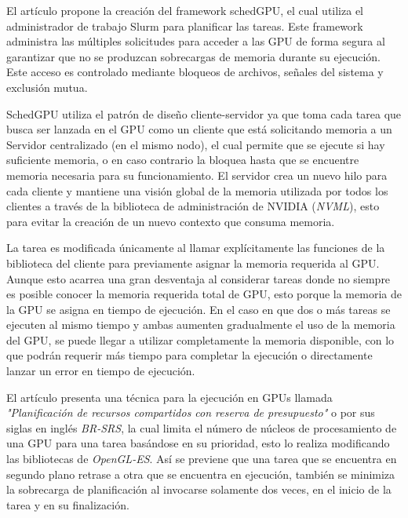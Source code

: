 
El artículo \cite{IntraNode} propone la creación del framework schedGPU, el cual utiliza el administrador de trabajo Slurm para planificar las tareas. Este framework administra las múltiples solicitudes para acceder a las GPU de forma segura al garantizar que no se produzcan sobrecargas de memoria durante su ejecución. Este acceso es controlado mediante bloqueos de archivos, señales del sistema y exclusión mutua.

SchedGPU utiliza el patrón de diseño cliente-servidor ya que toma cada tarea que busca ser lanzada en el GPU como un cliente que está solicitando memoria a un Servidor centralizado (en el mismo nodo), el cual permite que se ejecute si hay suficiente memoria, o en caso contrario la bloquea hasta que se encuentre memoria necesaria para su funcionamiento. El servidor crea un nuevo hilo para cada cliente y mantiene una visión global de la memoria utilizada por todos los clientes a través de la biblioteca de administración de NVIDIA (\textit{NVML}), esto para evitar la creación de un nuevo contexto que consuma memoria.

\vspace{0.3cm}

La tarea es modificada únicamente al llamar explícitamente las funciones de la biblioteca del cliente para previamente asignar la memoria requerida al GPU. Aunque esto acarrea una gran desventaja al considerar tareas donde no siempre es posible conocer la memoria requerida total de GPU, esto porque la memoria de la GPU se asigna en tiempo de ejecución. En el caso en que dos o más tareas se ejecuten al mismo tiempo y ambas aumenten gradualmente el uso de la memoria del GPU, se puede llegar a utilizar completamente la memoria disponible, con lo que podrán requerir más tiempo para completar la ejecución o directamente lanzar un error en tiempo de ejecución.
	
	
	El artículo \cite{Pridriven} presenta una técnica para la ejecución en GPUs llamada \textit{"Planificación de recursos compartidos con reserva de presupuesto"} o por sus siglas en inglés \textit{BR-SRS}, la cual limita el número de núcleos de procesamiento de una GPU para una tarea basándose en su prioridad, esto lo realiza modificando las bibliotecas de  \textit{OpenGL-ES}. Así se previene que una tarea que se encuentra en segundo plano retrase a otra que se encuentra en ejecución, también se minimiza la sobrecarga de planificación al invocarse solamente dos veces, en el inicio de la tarea y en su finalización.

